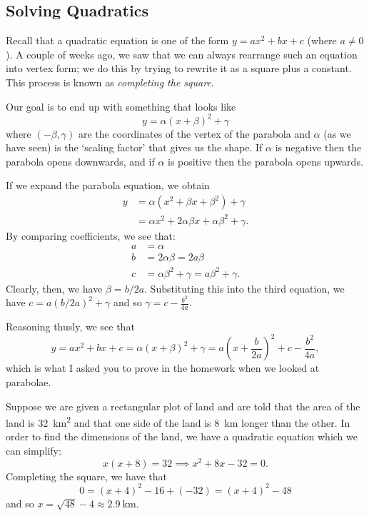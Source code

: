 



\subsection*{Solving Quadratics}
Recall that a quadratic equation is one of the form $ y = ax^2 + bx + c $ (where $ a \neq 0 $). A couple of weeks ago, we saw that we
can always rearrange such an equation into vertex form; we do this by trying to rewrite it as a square plus a constant. This process
is known as \emph{completing the square}.

Our goal is to end up with something that looks like
\begin{displaymath}
  y = \alpha(x + \beta)^2 + \gamma
\end{displaymath}
where $ (-\beta,\gamma) $ are the coordinates of the vertex of the parabola and $ \alpha $ (as we have seen) is the `scaling factor'
that gives us the shape. If $ \alpha $ is negative then the parabola opens downwards, and if $ \alpha $ is positive then the parabola
opens upwards.

If we expand the parabola equation, we obtain
\begin{align*}
  y &= \alpha (x^2 + \beta x + \beta^2) + \gamma\\
    &= \alpha x^2 + 2\alpha \beta x + \alpha \beta^2 + \gamma.
\end{align*}
By comparing coefficients, we see that:
\begin{align*}
  a &= \alpha\\
  b &= 2\alpha \beta = 2a\beta\\
  c &= \alpha\beta^2 + \gamma = a\beta^2 + \gamma.
\end{align*}
Clearly, then, we have $ \beta = b/2a $. Substituting this into the third equation, we have $ c = a(b/2a)^2+ \gamma $
and so $ \gamma = c - \frac{b^2}{4a} $.

Reasoning thusly, we see that
\begin{displaymath}
  y = ax^2 + bx + c = \alpha(x + \beta)^2 + \gamma = a\left(x + \frac{b}{2a}\right)^2 + c - \frac{b^2}{4a},
\end{displaymath}
which is what I asked you to prove in the homework when we looked at parabolae.

\begin{ex}
  Suppose we are given a rectangular plot of land and are told that the area of the land is \SI{32}{\kilo\metre\squared} and that
  one side of the land is \SI{8}{\kilo\metre} longer than the other. In order to find the dimensions of the land, we have a quadratic
  equation which we can simplify:
  \begin{displaymath}
    x(x + 8) = 32 \implies x^2 + 8x - 32 = 0.
  \end{displaymath}
  Completing the square, we have that
  \begin{displaymath}
    0 = (x + 4)^2 - 16 + (-32) = (x + 4)^2 - 48
  \end{displaymath}
  and so $ x = \sqrt{48} - 4 \approx \SI{2.9}{\kilo\metre} $.
\end{ex}

